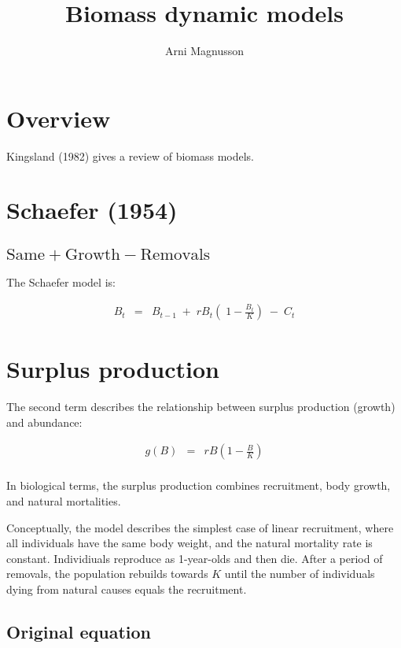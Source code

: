 \documentclass[fleqn]{article}
\begin{document}
\title{Biomass dynamic models}
\author{Arni Magnusson}
\maketitle
\tableofcontents

\section{Overview}

Kingsland (1982) gives a review of biomass models.

\newpage

\section{Schaefer (1954)}

\subsection{$\mathrm{Same}+\mathrm{Growth}-\mathrm{Removals}$}

The Schaefer model is:

\begin{eqnarray*}
  B_t &=& B_{t-1} \;+\; rB_t\!\left(\;\!\!1\!-\!\frac{B_t}{K}\right) \;-\; C_t
\end{eqnarray*}

\section{Surplus production}

The second term describes the relationship between surplus production (growth)
and abundance:

\begin{eqnarray*}
  g(B) &=& rB\left(1-\frac{B}{K}\right)\\[1ex]
\end{eqnarray*}

In biological terms, the surplus production combines recruitment, body growth,
and natural mortalities.

Conceptually, the model describes the simplest case of linear recruitment, where
all individuals have the same body weight, and the natural mortality rate is
constant. Individiuals reproduce as 1-year-olds and then die. After a period of
removals, the population rebuilds towards $K$ until the number of individuals
dying from natural causes equals the recruitment.

\subsection{Original equation}
\end{document}
